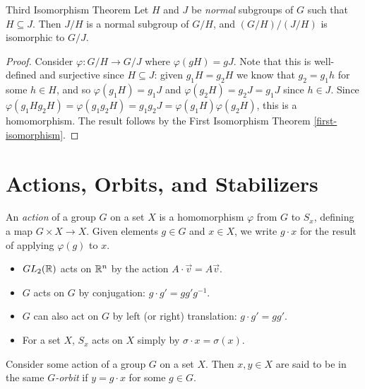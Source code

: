 \begin{thm}Third Isomorphism Theorem\label{third-isomorphism}\proofbreak
    Let $H$ and $J$ be \emph{normal} subgroups of $G$ such that $H \subseteq J$. Then $J/H$ is a normal subgroup of $G/H$, and $(G/H)/(J/H)$ is isomorphic to $G/J$.
\end{thm}

\begin{proof}
    Consider $\varphi: G/H \to G/J$ where $\varphi(gH) = gJ$. Note that this is well-defined and surjective since $H \subseteq J$: given $g_1H = g_2H$ we know that $g_2 = g_1h$ for some $h \in H$, and so $\varphi(g_1H) = g_1J$ and $\varphi(g_2H) = g_2J = g_1J$ since $h \in J$. Since $\varphi(g_1Hg_2H) = \varphi(g_1g_2H) = g_1g_2J = \varphi(g_1H)\varphi(g_2H)$, this is a homomorphism. The result follows by the First Isomorphism Theorem \ref{first-isomorphism}.
\end{proof}

\section{Actions, Orbits, and Stabilizers}

\begin{defn}
    An \emph{action} of a group $G$ on a set $X$ is a homomorphism $\varphi$ from $G$ to $S_x$, defining a map $G \times X \to X$. Given elements $g \in G$ and $x \in X$, we write $g \cdot x$ for the result of applying $\varphi(g)$ to $x$.
\end{defn}

\begin{exmp}\proofbreak
    \begin{itemize}
        \item $GL_2(\mathbb{R})$ acts on $\mathbb{R}^n$ by the action $A \cdot \vec{v} = A\vec{v}$.
        \item $G$ acts on $G$ by conjugation: $g \cdot g' = gg'g^{-1}$.
        \item $G$ can also act on $G$ by left (or right) translation: $g \cdot g' = gg'$.
        \item For a set $X$, $S_x$ acts on $X$ simply by $\sigma \cdot x = \sigma(x)$.
    \end{itemize}
\end{exmp}

\begin{defn}
    Consider some action of a group $G$ on a set $X$. Then $x, y \in X$ are said to be in the same \emph{$G$-orbit} if $y = g \cdot x$ for some $g \in G$.
\end{defn}

